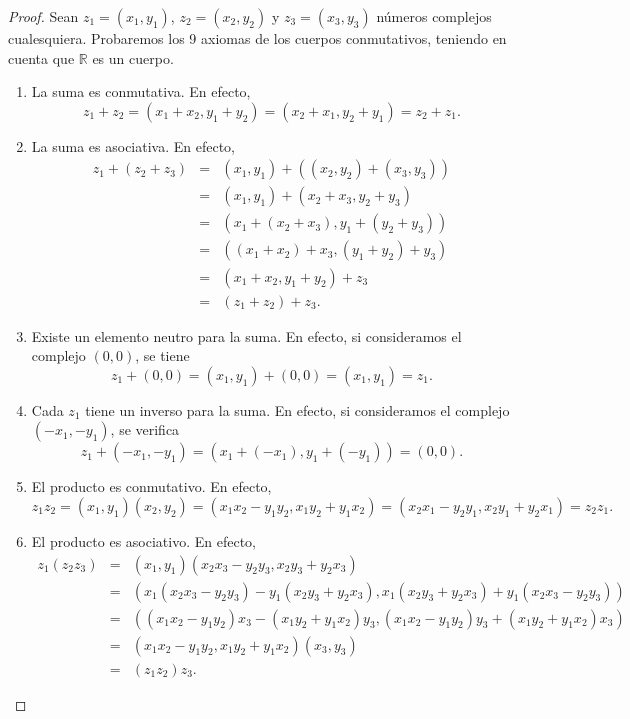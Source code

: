 \begin{proof}
Sean $z_1 = (x_1,y_1)$, $z_2 = (x_2,y_2)$ y $z_3 = (x_3, y_3)$ números complejos cualesquiera. Probaremos los 9 axiomas de los cuerpos conmutativos, teniendo en cuenta que $\mathbb{R}$ es un cuerpo. 

\begin{enumerate}
\item La suma es conmutativa. En efecto,
$$z_1 + z_2 = (x_1 + x_2, y_1 + y_2) = (x_2 + x_1, y_2 + y_1) = z_2 + z_1.$$

\item La suma es asociativa. En efecto,
\begin{eqnarray*}
z_1 + (z_2 + z_3) &=& (x_1,y_1) + ((x_2,y_2) + (x_3,y_3)) \\
&=& (x_1 ,y_1) + (x_2 + x_3, y_2 + y_3 )  \\
&=& (x_1 + (x_2 + x_3), y_1 + (y_2 + y_3)) \\
&=& ((x_1 + x_2) + x_3, (y_1 + y_2) + y_3) \\
&=& (x_1 + x_2, y_1 + y_2)  + z_3 \\
&=& (z_1 + z_2) + z_3.
\end{eqnarray*}

\item Existe un elemento neutro para la suma. En efecto, si consideramos el complejo $(0,0)$, se tiene
$$z_1 + (0,0) = (x_1,y_1) + (0,0) = (x_1, y_1) = z_1.$$

\item Cada $z_1$ tiene un inverso para la suma. En efecto, si consideramos el complejo $(-x_1, -y_1)$, se verifica
$$z_1 + (-x_1, -y_1) = (x_1 + (-x_1), y_1 + (-y_1)) = (0,0).$$

\item El producto es conmutativo. En efecto, 
$$z_1 z_2 = (x_1, y_1) (x_2,y_2) = (x_1 x_2 - y_1y_2, x_1 y_2 + y_1x_2) = (x_2 x_1 - y_2y_1,  x_2y_1 + y_2x_1 ) = z_2 z_1.$$

\item El producto es asociativo. En efecto,
\begin{eqnarray*}
z_1 (z_2 z_3) &=& (x_1,y_1) (x_2x_3 - y_2y_3, x_2y_3 + y_2 x_3) \\
&=& (x_1(x_2 x_3 - y_2y_3) - y_1 (x_2y_3 + y_2 x_3), x_1 (x_2y_3 + y_2x_3) + y_1(x_2x_3 - y_2y_3)) \\
&=& ((x_1x_2 - y_1y_2)x_3 - (x_1 y_2 + y_1x_2)y_3 , (x_1 x_2 - y_1y_2) y_3 + (x_1 y_2 + y_1 x_2)x_3) \\
&=& (x_1 x_2 - y_1y_2, x_1y_2 + y_1 x_2)(x_3,y_3) \\
&=& (z_1 z_2) z_3.
\end{eqnarray*}


\end{enumerate}
\end{proof}

